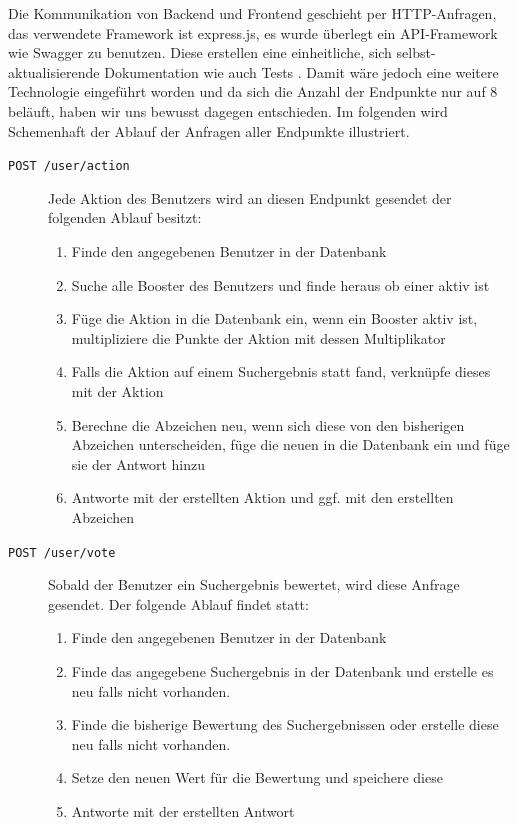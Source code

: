 \documentclass[12pt,twoside]{book}
\begin{document}
Die Kommunikation von Backend und Frontend geschieht per HTTP-Anfragen, das verwendete Framework ist express.js, es wurde überlegt ein API-Framework wie Swagger zu benutzen. Diese erstellen eine einheitliche, sich selbst-aktualisierende Dokumentation wie auch Tests \cite{haupt2014model}.
Damit wäre jedoch eine weitere Technologie eingeführt worden und da sich die Anzahl der Endpunkte nur auf 8 beläuft, haben wir uns bewusst dagegen entschieden. Im folgenden wird Schemenhaft der Ablauf der Anfragen aller Endpunkte illustriert.

\begin{description}
	\item[\texttt{POST  /user/action}] Jede Aktion des Benutzers wird an diesen Endpunkt gesendet der folgenden Ablauf besitzt: 
	\begin{enumerate}
		\item Finde den angegebenen Benutzer in der Datenbank
		\item Suche alle Booster des Benutzers und finde heraus ob einer aktiv ist
		\item Füge die Aktion in die Datenbank ein, wenn ein Booster aktiv ist, multipliziere die Punkte der Aktion mit dessen Multiplikator
		\item Falls die Aktion auf einem Suchergebnis statt fand, verknüpfe dieses mit der Aktion
		\item Berechne die Abzeichen neu, wenn sich diese von den bisherigen Abzeichen unterscheiden, füge die neuen in die Datenbank ein und füge sie der Antwort hinzu
		\item Antworte mit der erstellten Aktion und ggf. mit den erstellten Abzeichen
	\end{enumerate}
	\item[\texttt{POST /user/vote}] Sobald der Benutzer ein Suchergebnis bewertet, wird diese Anfrage gesendet. Der folgende Ablauf findet statt:
	\begin{enumerate}
		\item Finde den angegebenen Benutzer in der Datenbank
		\item Finde das angegebene Suchergebnis in der Datenbank und erstelle es neu falls nicht vorhanden.
		\item Finde die bisherige Bewertung des Suchergebnissen oder erstelle diese neu falls nicht vorhanden.
		\item Setze den neuen Wert für die Bewertung und speichere diese
		\item Antworte mit der erstellten Antwort
	\end{enumerate}

\end{description}
\end{document}
